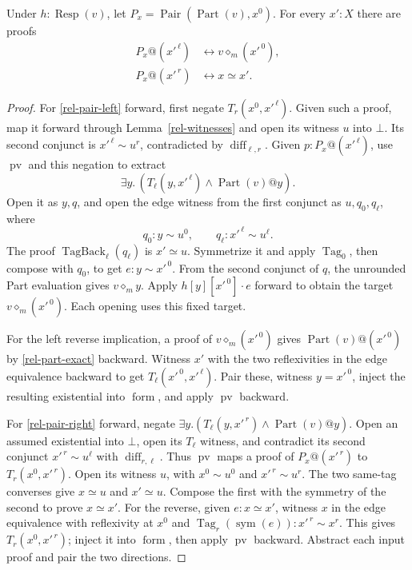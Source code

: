 \begin{lemma}
\label{rel-pair-laws}
Under \(h:\operatorname{Resp}(v)\), let
\(P_x=\operatorname{Pair}(\operatorname{Part}(v),x^0)\).
For every \(x':X\) there are proofs
\begin{align}
 P_x@(x'^{\,\ell})&\leftrightarrow
                         v\diamond_m(x'^{\,0}), \label{rel-pair-left}\\
 P_x@(x'^{\,r})&\leftrightarrow x\simeq x'. \label{rel-pair-right}
\end{align}
\end{lemma}
\begin{proof}
For \eqref{rel-pair-left} forward, first negate
\(T_r(x^0,x'^{\,\ell})\).  Given such a proof, map it
forward through Lemma~\ref{rel-witnesses} and open its
witness \(u\) into \(\bot\).  Its second conjunct is
\(x'^{\,\ell}\sim u^r\), contradicted by
\(\operatorname{diff}_{\ell,r}\).
Given \(p:P_x@(x'^{\,\ell})\), use
\(\operatorname{pv}\) and this negation to extract
\[
 \exists y.\,
       (T_\ell(y,x'^{\,\ell})\land\operatorname{Part}(v)@y).
\]
Open it as \(y,q\), and open the edge witness from the
first conjunct as \(u,q_0,q_\ell\), where
\[
 q_0:y\sim u^0,\qquad q_\ell:x'^{\,\ell}\sim u^\ell.
\]
The proof \(\operatorname{TagBack}_\ell(q_\ell)\) is
\(x'\simeq u\).  Symmetrize it and apply
\(\operatorname{Tag}_0\), then compose with \(q_0\),
to get \(e:y\sim x'^{\,0}\).
From the second conjunct of \(q\), the unrounded Part
evaluation gives \(v\diamond_m y\).
Apply \(h[y][x'^{\,0}]\cdot e\) forward to obtain the
target \(v\diamond_m(x'^{\,0})\).  Each opening uses this
fixed target.

For the left reverse implication, a proof of
\(v\diamond_m(x'^{\,0})\) gives
\(\operatorname{Part}(v)@(x'^{\,0})\) by
\eqref{rel-part-exact} backward.  Witness \(x'\) with
the two reflexivities in the edge equivalence backward
to get \(T_\ell(x'^{\,0},x'^{\,\ell})\).
Pair these, witness \(y=x'^{\,0}\), inject the resulting
existential into \(\operatorname{form}\), and apply
\(\operatorname{pv}\) backward.

For \eqref{rel-pair-right} forward, negate
\(\exists y.(T_\ell(y,x'^{\,r})\land\operatorname{Part}(v)@y)\).
Open an assumed existential into \(\bot\), open its
\(T_\ell\) witness, and contradict its second conjunct
\(x'^{\,r}\sim u^\ell\) with \(\operatorname{diff}_{r,\ell}\).
Thus \(\operatorname{pv}\) maps a proof of
\(P_x@(x'^{\,r})\) to \(T_r(x^0,x'^{\,r})\).
Open its witness \(u\), with
\(x^0\sim u^0\) and \(x'^{\,r}\sim u^r\).
The two same-tag converses give \(x\simeq u\) and
\(x'\simeq u\).  Compose the first with the symmetry of
the second to prove \(x\simeq x'\).
For the reverse, given \(e:x\simeq x'\), witness \(x\)
in the edge equivalence with reflexivity at \(x^0\) and
\(\operatorname{Tag}_r(\operatorname{sym}(e)):
x'^{\,r}\sim x^r\).  This gives \(T_r(x^0,x'^{\,r})\);
inject it into \(\operatorname{form}\), then apply
\(\operatorname{pv}\) backward.
Abstract each input proof and pair the two directions.
\end{proof}

